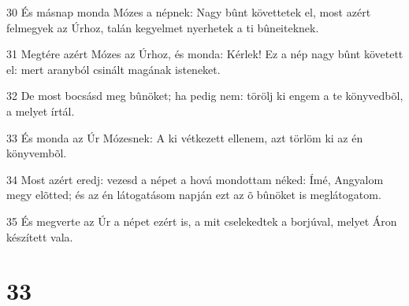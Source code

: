 \par 30 És másnap monda Mózes a népnek: Nagy bûnt követtetek el, most azért felmegyek az Úrhoz, talán kegyelmet nyerhetek a ti bûneiteknek.
\par 31 Megtére azért Mózes az Úrhoz, és monda: Kérlek! Ez a nép nagy bûnt követett el: mert aranyból csinált magának isteneket.
\par 32 De most bocsásd meg bûnöket; ha pedig nem: törölj ki engem a te könyvedbõl, a melyet írtál.
\par 33 És monda az Úr Mózesnek: A ki vétkezett ellenem, azt törlöm ki az én könyvembõl.
\par 34 Most azért eredj: vezesd a népet a hová mondottam néked: Ímé, Angyalom megy elõtted; és az én látogatásom napján ezt az õ bûnöket is meglátogatom.
\par 35 És megverte az Úr a népet ezért is, a mit cselekedtek a borjúval, melyet Áron készített vala.

\chapter{33}

